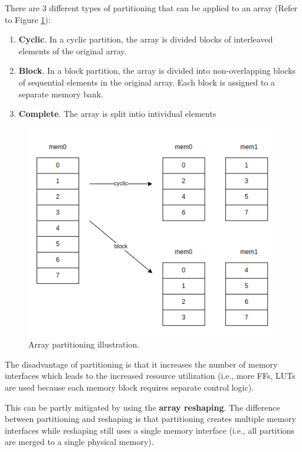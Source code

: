 \documentclass[a4paper, twoside]{report}
\theoremstyle{definition}
\numberwithin{equation}{section}
\begin{document}
There are 3 different types of partitioning that can be applied to an array (Refer to Figure \ref{fig:array_partitioning}):

\begin{enumerate}
    \item \textbf{Cyclic}.
          In a cyclic partition, the array is divided blocks of interleaved elements of the original array.
    \item \textbf{Block}.
          In a block partition, the array is divided into non-overlapping blocks of sequential elements in the original array.
          Each block is assigned to a separate memory bank.
    \item \textbf{Complete}.
          The array is split intio intividual elements
\end{enumerate}



\begin{figure}[h!]
    \centering
    \includegraphics[scale=0.5]{array_partition_illust.png}
    \caption{Array partitioning illustration.}
    \label{fig:array_partitioning}
\end{figure}


The disadvantage of partitioning is that it increases the number of memory interfaces
which leads to the increased resource utilization (i.e., more FFs, LUTs are used because each memory block requires separate control logic).

This can be partly mitigated by using the \textbf{array reshaping}.
The difference between partitioning and reshaping is that partitioning
creates multiple memory interfaces while reshaping still uses a single memory interface
(i.e., all partitions are merged to a single physical memory).
\end{document}
